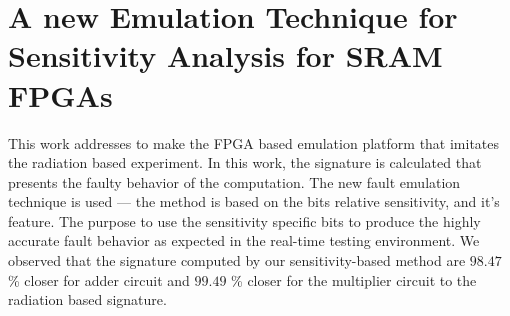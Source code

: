 

\section{A new Emulation Technique for Sensitivity Analysis
for SRAM FPGAs}
\label{intro}


This work addresses to make the FPGA based emulation platform that imitates the radiation based experiment. In this work, the signature is calculated that presents the faulty behavior of the computation. The new fault emulation technique is used --- the method is based on the bits relative sensitivity, and it's feature. The purpose to use the sensitivity specific bits to produce the highly accurate fault behavior as expected in the real-time testing environment.  We observed that the signature computed by our sensitivity-based method are $98.47$\% closer for adder circuit and $99.49$ \% closer for the multiplier circuit to the radiation based signature.

